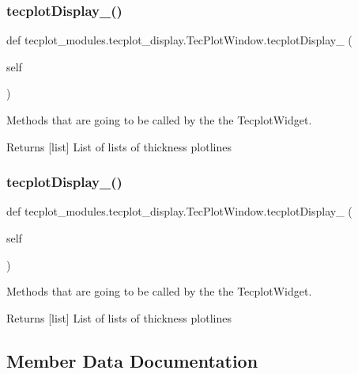 \subsubsection{\texorpdfstring{tecplot\+Display\+\_()}{tecplotDisplay\_3()}}
{\footnotesize\ttfamily def tecplot\+\_\+modules.\+tecplot\+\_\+display.\+Tec\+Plot\+Window.\+tecplot\+Display\+\_ (\begin{DoxyParamCaption}\item[{}]{self }\end{DoxyParamCaption})}



Methods that are going to be called by the the Tecplot\+Widget. 

\begin{DoxyReturn}{Returns}
\mbox{[}list\mbox{]} List of lists of thickness plotlines 
\end{DoxyReturn}
\hypertarget{a00110_acdc9dc387494507084a2ab2cc0c8d9ac}{}\label{a00110_acdc9dc387494507084a2ab2cc0c8d9ac} 
\subsubsection{\texorpdfstring{tecplot\+Display\+\_()}{tecplotDisplay\_4()}}
{\footnotesize\ttfamily def tecplot\+\_\+modules.\+tecplot\+\_\+display.\+Tec\+Plot\+Window.\+tecplot\+Display\+\_ (\begin{DoxyParamCaption}\item[{}]{self }\end{DoxyParamCaption})}



Methods that are going to be called by the the Tecplot\+Widget. 

\begin{DoxyReturn}{Returns}
\mbox{[}list\mbox{]} List of lists of thickness plotlines 
\end{DoxyReturn}


\subsection{Member Data Documentation}
\hypertarget{a00110_a7d3fabc52fc4c2d52b9aa4efea25131a}{}\label{a00110_a7d3fabc52fc4c2d52b9aa4efea25131a} 
